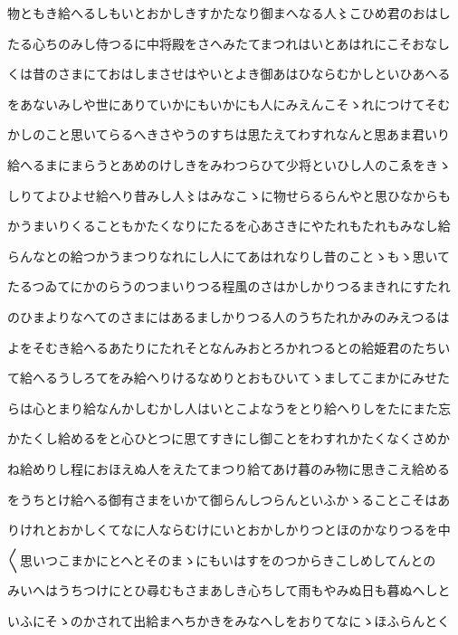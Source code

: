 \documentclass[a4paper,11pt,landscape]{ltjtarticle}
\begin{document}
\par\medskip
物ともき給へるしもいとおかしきすかたなり御まへなる人〻こひめ君のおはし
\par\medskip
たる心ちのみし侍つるに中将殿をさへみたてまつれはいとあはれにこそおなし
\par\medskip
くは昔のさまにておはしまさせはやいとよき御あはひならむかしといひあへる
\par\medskip
をあないみしや世にありていかにもいかにも人にみえんこそゝれにつけてそむ
\par\medskip
かしのこと思いてらるへきさやうのすちは思たえてわすれなんと思あま君いり
\par\medskip
給へるまにまらうとあめのけしきをみわつらひて少将といひし人のこゑをきゝ
\par\medskip
しりてよひよせ給へり昔みし人〻はみなこゝに物せらるらんやと思ひなからも
\par\medskip
かうまいりくることもかたくなりにたるを心あさきにやたれもたれもみなし給
\par\medskip
らんなとの給つかうまつりなれにし人にてあはれなりし昔のことゝもゝ思いて
\par\medskip
たるつゐてにかのらうのつまいりつる程風のさはかしかりつるまきれにすたれ
\par\medskip
のひまよりなへてのさまにはあるましかりつる人のうちたれかみのみえつるは
\par\medskip
よをそむき給へるあたりにたれそとなんみおとろかれつるとの給姫君のたちい
\par\medskip
て給へるうしろてをみ給へりけるなめりとおもひいてゝましてこまかにみせた
\par\medskip
らは心とまり給なんかしむかし人はいとこよなうをとり給へりしをたにまた忘
\par\medskip
かたくし給めるをと心ひとつに思てすきにし御ことをわすれかたくなくさめか
\par\medskip
ね給めりし程におほえぬ人をえたてまつり給てあけ暮のみ物に思きこえ給める
\par\medskip
をうちとけ給へる御有さまをいかて御らんしつらんといふかゝることこそはあ
\par\medskip
りけれとおかしくてなに人ならむけにいとおかしかりつとほのかなりつるを中
\par\medskip
〱思いつこまかにとへとそのまゝにもいはすをのつからきこしめしてんとの
\par\medskip
みいへはうちつけにとひ尋むもさまあしき心ちして雨もやみぬ日も暮ぬへしと
\par\medskip
いふにそゝのかされて出給まへちかきをみなへしをおりてなにゝほふらんとく
\end{document}
